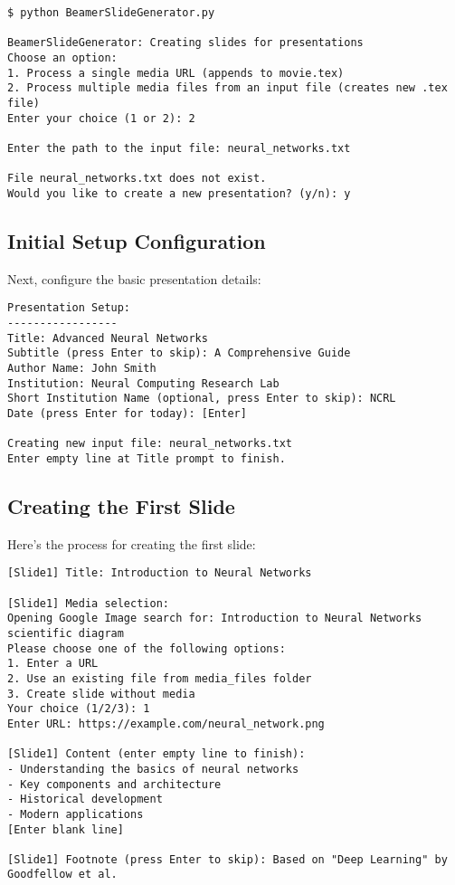 \documentclass{article}
\begin{document}
\begin{tcolorbox}[title=Initial Launch]
\begin{verbatim}
$ python BeamerSlideGenerator.py

BeamerSlideGenerator: Creating slides for presentations
Choose an option:
1. Process a single media URL (appends to movie.tex)
2. Process multiple media files from an input file (creates new .tex file)
Enter your choice (1 or 2): 2

Enter the path to the input file: neural_networks.txt

File neural_networks.txt does not exist.
Would you like to create a new presentation? (y/n): y
\end{verbatim}
\end{tcolorbox}

\subsection{Initial Setup Configuration}
Next, configure the basic presentation details:

\begin{tcolorbox}[title=Presentation Setup]
\begin{verbatim}
Presentation Setup:
-----------------
Title: Advanced Neural Networks
Subtitle (press Enter to skip): A Comprehensive Guide
Author Name: John Smith
Institution: Neural Computing Research Lab
Short Institution Name (optional, press Enter to skip): NCRL
Date (press Enter for today): [Enter]

Creating new input file: neural_networks.txt
Enter empty line at Title prompt to finish.
\end{verbatim}
\end{tcolorbox}

\subsection{Creating the First Slide}
Here's the process for creating the first slide:

\begin{tcolorbox}[title=First Slide Creation]
\begin{verbatim}
[Slide1] Title: Introduction to Neural Networks

[Slide1] Media selection:
Opening Google Image search for: Introduction to Neural Networks scientific diagram
Please choose one of the following options:
1. Enter a URL
2. Use an existing file from media_files folder
3. Create slide without media
Your choice (1/2/3): 1
Enter URL: https://example.com/neural_network.png

[Slide1] Content (enter empty line to finish):
- Understanding the basics of neural networks
- Key components and architecture
- Historical development
- Modern applications
[Enter blank line]

[Slide1] Footnote (press Enter to skip): Based on "Deep Learning" by Goodfellow et al.
\end{verbatim}
\end{tcolorbox}
\end{document}
